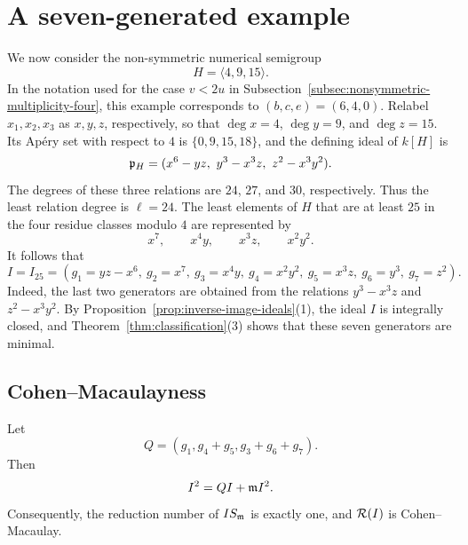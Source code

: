\section{A seven-generated example}
\label{sec:nonsymmetric-example}

We now consider the non-symmetric numerical semigroup
$$
 H=\langle4,9,15\rangle.
$$
In the notation used for the case $v<2u$ in
Subsection~\ref{subsec:nonsymmetric-multiplicity-four}, this example
corresponds to $(b,c,e)=(6,4,0)$.
Relabel $x_1,x_2,x_3$ as $x,y,z$, respectively, so that
$\deg x=4$, $\deg y=9$, and $\deg z=15$.
Its Ap\'ery set with respect to $4$ is $\{0,9,15,18\}$, and the defining
ideal of $k[H]$ is
$$
 \fkp_H=(x^6-yz,\ y^3-x^3z,\ z^2-x^3y^2).
$$
The degrees of these three relations are $24$, $27$, and $30$, respectively.
Thus the least relation degree is $\ell=24$.  The least elements of $H$ that
are at least $25$ in the four residue classes modulo $4$ are represented by
$$
 x^7,\qquad x^4y,\qquad x^3z,\qquad x^2y^2.
$$
It follows that
$$
 I=I_{25}=(g_1=yz-x^6,\ g_2=x^7,\ g_3=x^4y,\ g_4=x^2y^2,
             \ g_5=x^3z,\ g_6=y^3,\ g_7=z^2).
$$
Indeed, the last two generators are obtained from the relations
$y^3-x^3z$ and $z^2-x^3y^2$.  By
Proposition~\ref{prop:inverse-image-ideals}(1), the ideal $I$ is integrally
closed, and Theorem~\ref{thm:classification}(3) shows that these seven
generators are minimal.

\subsection{Cohen--Macaulayness}

\begin{proposition}
\label{prop:example-local-reduction}
Let
$$
 Q=(g_1,g_4+g_5,g_3+g_6+g_7).
$$
Then
$$
 I^2=QI+\mathfrak m I^2.
$$
Consequently, the reduction number of $IS_\mathfrak m$ is exactly one, and
$\mathcal R(I)$ is Cohen--Macaulay.
\end{proposition}

